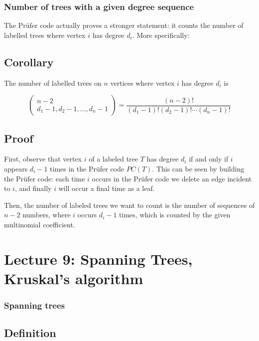 \documentclass[]{article}
\begin{document}
\subsubsection{Number of trees with a given degree
sequence}\label{number-of-trees-with-a-given-degree-sequence}

The Prüfer code actually proves a stronger statement: it counts the
number of labelled trees where vertex \(i\) has degree \(d_i\). More
specifically:

\subsection{Corollary}\label{corollary}

The number of labelled trees on \(n\) vertices where vertex \(i\) has
degree \(d_i\) is

\[\left( \begin{array}{cc} n-2 \\ d_1-1,d_2-1,\dots, d_n-1 \end{array}\right)=\frac{(n-2)!}{(d_1-1)!(d_2-1)!\cdots (d_n-1)!}\]

\subsection{Proof}\label{proof-9}

First, observe that vertex \(i\) of a labeled tree \(T\) has degree
\(d_i\) if and only if \(i\) appears \(d_i-1\) times in the Prüfer code
\(PC(T)\). This can be seen by building the Prüfer code: each time \(i\)
occurs in the Prüfer code we delete an edge incident to \(i\), and
finally \(i\) will occur a final time as a leaf.

Then, the number of labeled trees we want to count is the number of
sequences of \(n-2\) numbers, where \(i\) occurs \(d_i-1\) times, which
is counted by the given multinomial coefficient.

\section{Lecture 9: Spanning Trees, Kruskal's algorithm}

\subsubsection{Spanning trees}\label{spanning-trees}

\subsection{Definition}\label{definition-6}
\end{document}
